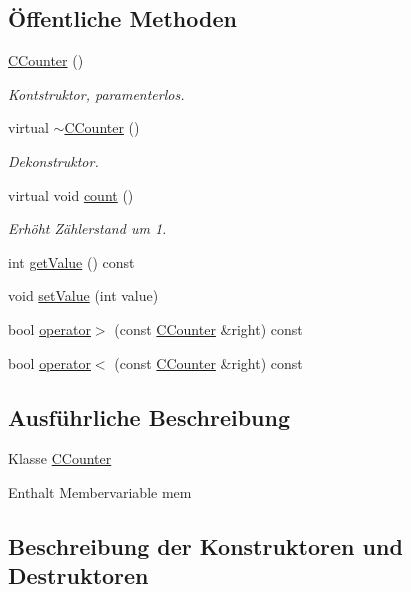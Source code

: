 \subsection*{Öffentliche Methoden}
\begin{DoxyCompactItemize}
\item 
\hyperlink{class_c_counter_ab83c6f9600beb5686747493da731a04c}{C\+Counter} ()
\begin{DoxyCompactList}\small\item\em Kontstruktor, paramenterlos. \end{DoxyCompactList}\item 
virtual \hyperlink{class_c_counter_a1af3cc000781fcd67b9e4fe1b25fbc9c}{$\sim$\+C\+Counter} ()
\begin{DoxyCompactList}\small\item\em Dekonstruktor. \end{DoxyCompactList}\item 
virtual void \hyperlink{class_c_counter_a90f3e164f3fc1dcf91044702d6940c4d}{count} ()
\begin{DoxyCompactList}\small\item\em Erhöht Zählerstand um 1. \end{DoxyCompactList}\item 
int \hyperlink{class_c_counter_ad91db4cd517159f7cbb7d3976eede482}{get\+Value} () const
\item 
void \hyperlink{class_c_counter_ac41245afdd95c0149e99bad21696a372}{set\+Value} (int value)
\item 
bool \hyperlink{class_c_counter_ab15aa17d719e8efa41d2d10d8bcac41c}{operator$>$} (const \hyperlink{class_c_counter}{C\+Counter} \&right) const
\item 
bool \hyperlink{class_c_counter_a037e2875c6d72c03fc72cb3cf13f5636}{operator$<$} (const \hyperlink{class_c_counter}{C\+Counter} \&right) const
\end{DoxyCompactItemize}


\subsection{Ausführliche Beschreibung}
Klasse \hyperlink{class_c_counter}{C\+Counter}

Enthalt Membervariable mem 

\subsection{Beschreibung der Konstruktoren und Destruktoren}
\mbox{\label{class_c_counter_ab83c6f9600beb5686747493da731a04c}} 
